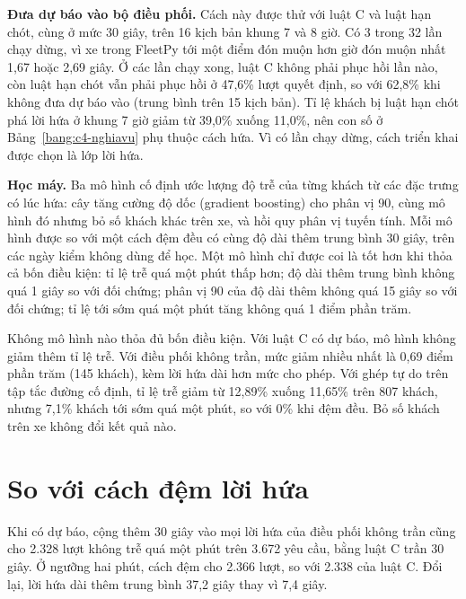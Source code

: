 \textbf{Đưa dự báo vào bộ điều phối.} Cách này được thử với luật C và luật hạn chót, cùng ở mức 30 giây, trên 16
kịch bản khung 7 và 8 giờ. Có 3 trong 32 lần chạy dừng, vì xe trong FleetPy tới một điểm đón muộn hơn giờ đón muộn
nhất 1,67 hoặc 2,69 giây. Ở các lần chạy xong, luật C không phải phục hồi lần nào, còn luật hạn chót vẫn phải phục
hồi ở 47,6\% lượt quyết định, so với 62,8\% khi không đưa dự báo vào (trung bình trên 15 kịch bản). Tỉ lệ khách bị
luật hạn chót phá lời hứa ở khung 7 giờ giảm từ 39,0\% xuống 11,0\%, nên con số ở Bảng~\ref{bang:c4-nghiavu} phụ
thuộc cách hứa. Vì có lần chạy dừng, cách triển khai được chọn là lớp lời hứa.

\textbf{Học máy.} Ba mô hình cố định ước lượng độ trễ của từng khách từ các đặc trưng có lúc hứa: cây tăng cường độ
dốc (gradient boosting) cho phân vị 90, cùng mô hình đó nhưng bỏ số khách khác trên xe, và hồi quy phân vị tuyến tính.
Mỗi mô hình được so với một cách đệm đều có cùng độ dài thêm trung bình 30 giây, trên các ngày kiểm không dùng để học.
Một mô hình chỉ được coi là tốt hơn khi thỏa cả bốn điều kiện: tỉ lệ trễ quá một phút thấp hơn; độ dài thêm trung
bình không quá 1 giây so với đối chứng; phân vị 90 của độ dài thêm không quá 15 giây so với đối chứng; tỉ lệ tới sớm
quá một phút tăng không quá 1 điểm phần trăm.

Không mô hình nào thỏa đủ bốn điều kiện. Với luật C có dự báo, mô hình không giảm thêm tỉ lệ trễ. Với điều phối không
trần, mức giảm nhiều nhất là 0,69 điểm phần trăm (145 khách), kèm lời hứa dài hơn mức cho phép. Với ghép tự do trên
tập tắc đường cố định, tỉ lệ trễ giảm từ 12,89\% xuống 11,65\% trên 807 khách, nhưng 7,1\% khách tới sớm quá một phút,
so với 0\% khi đệm đều. Bỏ số khách trên xe không đổi kết quả nào.

\section{So với cách đệm lời hứa}
\label{muc:c4-dem}

Khi có dự báo, cộng thêm 30 giây vào mọi lời hứa của điều phối không trần cũng cho 2.328 lượt không trễ quá một
phút trên 3.672 yêu cầu, bằng luật C trần 30 giây. Ở ngưỡng hai phút, cách đệm cho 2.366 lượt, so với 2.338 của luật
C. Đổi lại, lời hứa dài thêm trung bình 37,2 giây thay vì 7,4 giây.

